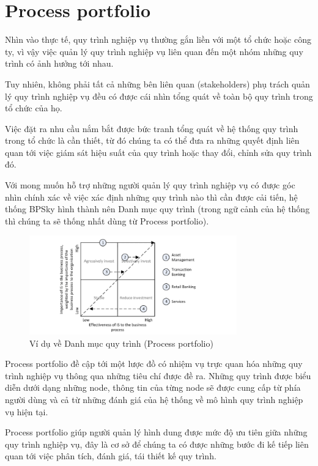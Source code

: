 \section{Process portfolio}

Nhìn vào thực tế, quy trình nghiệp vụ thường gắn liền với một tổ chức hoặc công ty, vì vậy việc quản lý quy trình nghiệp vụ liên quan đến một nhóm những quy trình có ảnh hưởng tới nhau. 

Tuy nhiên, không phải tất cả những bên liên quan (stakeholders) phụ trách quản lý quy trình nghiệp vụ đều có được cái nhìn tổng quát về toàn bộ quy trình trong tổ chức của họ. 

Việc đặt ra nhu cầu nắm bắt được bức tranh tổng quát về hệ thống quy trình trong tổ chức là cần thiết, từ đó chúng ta có thể đưa ra những quyết định liên quan tới việc giám sát hiệu suất của quy trình hoặc thay đổi, chỉnh sửa quy trình đó.

Với mong muốn hỗ trợ những người quản lý quy trình nghiệp vụ có được góc nhìn chính xác về việc xác định những quy trình nào thì cần được cải tiến, hệ thống BPSky hình thành nên Danh mục quy trình (trong ngữ cảnh của hệ thống thì chúng ta sẽ thống nhất dùng từ Process portfolio). 

\begin{figure}[H]
    \begin{center}
        \includegraphics[width=0.8\textwidth]{Content/Cơ sở lý thuyết/documents/Process portfolio/images/ProcessPortfolioIllustration.png}
        \vspace{0.5cm}
        \caption{Ví dụ về Danh mục quy trình (Process portfolio)}
        \label{fig: Ví dụ về Danh mục quy trình (Process portfolio)}
    \end{center}
\end{figure}

Process portfolio đề cập tới một lược đồ có nhiệm vụ trực quan hóa những quy trình nghiệp vụ thông qua những tiêu chí được đề ra. Những quy trình được biểu diễn dưới dạng những node, thông tin của từng node sẽ được cung cấp từ phía người dùng và cả từ những đánh giá của hệ thống về mô hình quy trình nghiệp vụ hiện tại.

Process portfolio giúp người quản lý hình dung được mức độ ưu tiên giữa những quy trình nghiệp vụ, đây là cơ sở để chúng ta có được những bước đi kế tiếp liên quan tới việc phân tích, đánh giá, tái thiết kế quy trình.